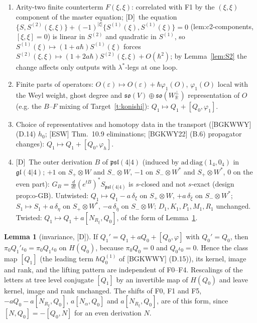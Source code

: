 \documentclass[11pt]{article}
\theoremstyle{definition}
\newtheorem{lemma}{Lemma}
\newcommand{\Dl}{\textup{[D]}}
\begin{document}
\begin{enumerate}
\item[F2.] Arity-two finite counterterm $F(\xi,\xi)$: correlated with F1 by the $(\xi,\xi)$ component of the master equation; \Dl\ the equation $\{S,S^{(2)}(\xi,\xi)\}+(-1)^{|\xi|}\{S^{(1)}(\xi),S^{(1)}(\xi)\}=0$ (lem:c2-components, $[\xi,\xi]=0$) is linear in $S^{(2)}$ and quadratic in $S^{(1)}$, so $S^{(1)}(\xi)\mapsto(1+a\hbar)S^{(1)}(\xi)$ forces $S^{(2)}(\xi,\xi)\mapsto(1+2a\hbar)S^{(2)}(\xi,\xi)+O(\hbar^2)$; by Lemma~\ref{lem:S2} the change affects only outputs with $\lambda^*$-legs at one loop.
\item[F3.] Finite parts of operators: $O(\varepsilon)\mapsto O(\varepsilon)+\hbar\varphi_1(O)$, $\varphi_1(O)$ local with the Weyl weight, ghost degree and $\mathfrak{so}(V)\oplus\mathfrak{so}(W^\perp_{\mathbb R})$ representation of $O$ (e.g. the $B$--$F$ mixing of Target~\ref{t:konishi}): $Q_1\mapsto Q_1+[Q_0,\varphi_1]$.
\item[F4.] Choice of representatives and homotopy data in the transport ([BGKWWY] (D.14) $h_0$; [ESW] Thm.~10.9 eliminations; [BGKWY22] (B.6) propagator changes): $Q_1\mapsto Q_1+[Q_0,\varphi_h]$.
\item[F5.] \Dl\ The outer derivation $B$ of $\mathfrak{psl}(4|4)$ (induced by $\mathrm{ad}\,\mathrm{diag}(1_4,0_4)$ in $\mathfrak{gl}(4|4)$; $+1$ on $S_+\otimes W$ and $S_-\otimes W$, $-1$ on $S_-\otimes W^*$ and $S_+\otimes W^*$, $0$ on the even part): $G_B=\frac d{dt}(e^{tB})^*S_{\mathfrak{psl}(4|4)}$ is $s$-closed and not $s$-exact (design prop:o-GB). Untwisted: $Q_1\mapsto Q_1-a\,\delta_\xi$ on $S_+\otimes W$, $+a\,\delta_{\bar\xi}$ on $S_-\otimes W^*$; $S_1\mapsto S_1+a\,\delta_\eta$ on $S_+\otimes W^*$, $-a\,\delta_{\bar\eta}$ on $S_-\otimes W$; $D_1,K_1,P_1,M_1,R_1$ unchanged. Twisted: $Q_1\mapsto Q_1+a[N_{R_\xi},Q_0]$, of the form of Lemma~\ref{lem:inv}.
\end{enumerate}

\begin{lemma}[invariance, \Dl]\label{lem:inv}
If $Q_1'=Q_1+aQ_0+[Q_0,\varphi]$ with $Q_0'=Q_0$, then $\pi_0Q_1'\iota_0=\pi_0Q_1\iota_0$ on $H(Q_0)$, because $\pi_0Q_0=0$ and $Q_0\iota_0=0$. Hence the class map $[Q_1]$ (the leading term $\hbar Q^{(1)}_0$ of [BGKWWY] (D.15)), its kernel, image and rank, and the lifting pattern are independent of F0--F4. Rescalings of the letters at tree level conjugate $[Q_1]$ by an invertible map of $H(Q_0)$ and leave kernel, image and rank unchanged. The shifts of F0, F1 and F5, $-aQ_0-a[N_{R_\xi},Q_0]$, $a[N_\alpha,Q_0]$ and $a[N_{R_\xi},Q_0]$, are of this form, since $[N,Q_0]=-[Q_0,N]$ for an even derivation $N$.
\end{lemma}
\end{document}
